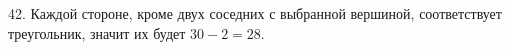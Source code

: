 42. Каждой стороне, кроме двух соседних с выбранной вершиной, соответствует треугольник, значит их будет $30-2=28.$\\

